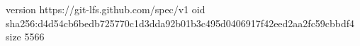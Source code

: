 version https://git-lfs.github.com/spec/v1
oid sha256:d4d54cb6bedb725770c1d3dda92b01b3c495d0406917f42eed2aa2fc59cbbdf4
size 5566
